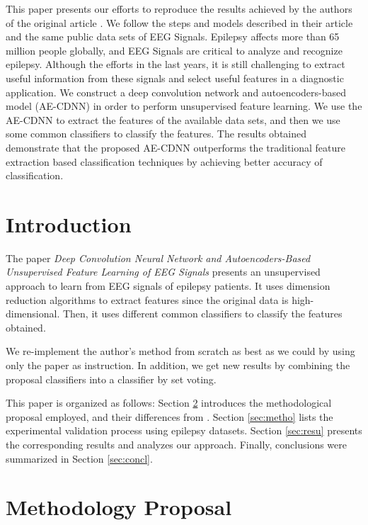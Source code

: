 
This paper presents our efforts to reproduce the results achieved by the authors of the original article \cite{WenZha:2018}. We follow the steps and models described in their article and the same public data sets of EEG Signals. Epilepsy affects more than 65 million people globally, and EEG Signals are critical to analyze and recognize epilepsy. Although the efforts in the last years, it is still challenging to extract useful information from these signals and select useful features in a diagnostic application. We construct a deep convolution network and autoencoders-based model (AE-CDNN) in order to perform unsupervised feature learning. We use the AE-CDNN to extract the features of the available data sets, and then we use some common classifiers to classify the features. The results obtained demonstrate that the proposed AE-CDNN outperforms the traditional feature extraction based classification techniques by achieving better accuracy of classification.

\section{Introduction}

The paper {\it Deep Convolution Neural Network and Autoencoders-Based Unsupervised Feature Learning of EEG Signals} \cite{WenZha:2018} presents an unsupervised approach to learn from EEG signals of epilepsy patients. It uses dimension reduction algorithms to extract features since the original data is high-dimensional. Then, it uses different common classifiers to classify the features obtained. 	

We re-implement the author's method from scratch as best as we could by using only the paper as instruction. In addition, we get new results by combining the proposal classifiers into a classifier by set voting.

This paper is organized as follows: Section \ref{sec:propose} introduces the methodological proposal employed, and their differences from \cite{WenZha:2018}. Section \ref{sec:metho} lists the experimental validation process using epilepsy datasets. Section \ref{sec:resu} presents the corresponding results and analyzes our approach. Finally, conclusions were summarized in Section \ref{sec:concl}.







\section{Methodology Proposal}
\label{sec:propose}

